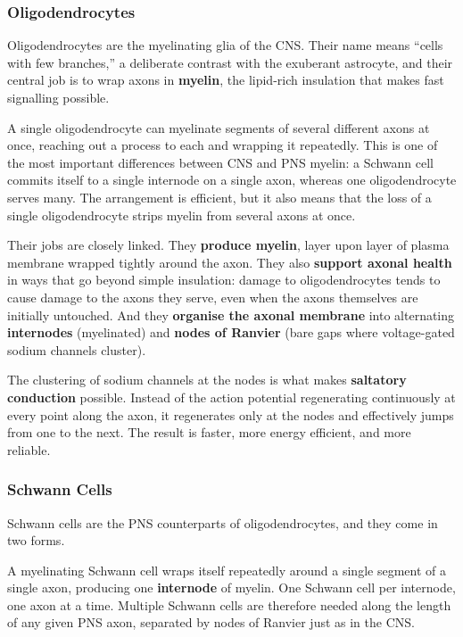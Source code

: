 \documentclass[11pt]{article}
\begin{document}
\subsubsection{Oligodendrocytes}

Oligodendrocytes are the myelinating glia of the CNS. Their name means ``cells with few branches,'' a deliberate contrast with the exuberant astrocyte, and their central job is to wrap axons in \textbf{myelin}, the lipid-rich insulation that makes fast signalling possible.

A single oligodendrocyte can myelinate segments of several different axons at once, reaching out a process to each and wrapping it repeatedly. This is one of the most important differences between CNS and PNS myelin: a Schwann cell commits itself to a single internode on a single axon, whereas one oligodendrocyte serves many. The arrangement is efficient, but it also means that the loss of a single oligodendrocyte strips myelin from several axons at once.

Their jobs are closely linked. They \textbf{produce myelin}, layer upon layer of plasma membrane wrapped tightly around the axon. They also \textbf{support axonal health} in ways that go beyond simple insulation: damage to oligodendrocytes tends to cause damage to the axons they serve, even when the axons themselves are initially untouched. And they \textbf{organise the axonal membrane} into alternating \textbf{internodes} (myelinated) and \textbf{nodes of Ranvier} (bare gaps where voltage-gated sodium channels cluster).

The clustering of sodium channels at the nodes is what makes \textbf{saltatory conduction} possible. Instead of the action potential regenerating continuously at every point along the axon, it regenerates only at the nodes and effectively jumps from one to the next. The result is faster, more energy efficient, and more reliable.

\subsubsection{Schwann Cells}

Schwann cells are the PNS counterparts of oligodendrocytes, and they come in two forms.

A myelinating Schwann cell wraps itself repeatedly around a single segment of a single axon, producing one \textbf{internode} of myelin. One Schwann cell per internode, one axon at a time. Multiple Schwann cells are therefore needed along the length of any given PNS axon, separated by nodes of Ranvier just as in the CNS.
\end{document}
